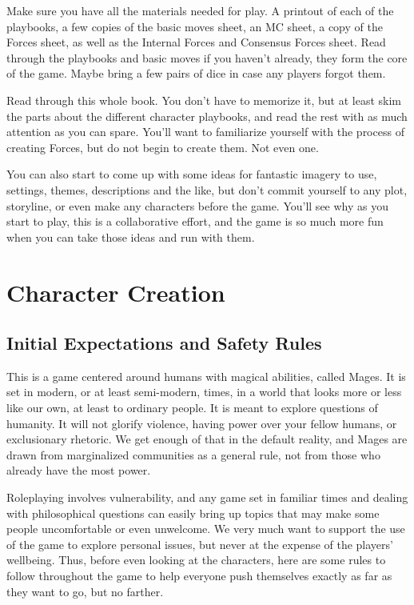 \documentclass[
  oneside,
  statementpaper,
  9pt]{memoir}
\begin{document}
\begin{MC}

Make sure you have all the materials needed for play. A printout of each of the playbooks, a few copies of the basic moves sheet, an MC sheet, a copy of the Forces sheet, as well as the Internal Forces and Consensus Forces sheet. Read through the playbooks and basic moves if you haven’t already, they form the core of the game. Maybe bring a few pairs of dice in case any players forgot them.

Read through this whole book. You don’t have to memorize it, but at least skim the parts about the different character playbooks, and read the rest with as much attention as you can spare. You’ll want to familiarize yourself with the process of creating Forces, but do not begin to create them. Not even one.

You can also start to come up with some ideas for fantastic imagery to use, settings, themes, descriptions and the like, but don’t commit yourself to any plot, storyline, or even make any characters before the game. You’ll see why as you start to play, this is a collaborative effort, and the game is so much more fun when you can take those ideas and run with them.

\end{MC}

\hypertarget{character-creation}{%
\section{Character Creation}\label{character-creation}}

\label{Safety Rules}

\hypertarget{initial-expectations-and-safety-rules}{%
\subsection{Initial Expectations and Safety
Rules}\label{initial-expectations-and-safety-rules}}

\begin{Narrator}

This is a game centered around humans with magical abilities, called Mages. It is set in modern, or at least semi-modern, times, in a world that looks more or less like our own, at least to ordinary people. It is meant to explore questions of humanity. It will not glorify violence, having power over your fellow humans, or exclusionary rhetoric. We get enough of that in the default reality, and Mages are drawn from marginalized communities as a general rule, not from those who already have the most power.

Roleplaying involves vulnerability, and any game set in familiar times and dealing with philosophical questions can easily bring up topics that may make some people uncomfortable or even unwelcome. We very much want to support the use of the game to explore personal issues, but never at the expense of the players’ wellbeing. Thus, before even looking at the characters, here are some rules to follow throughout the game to help everyone push themselves exactly as far as they want to go, but no farther.

\end{Narrator}
\end{document}
